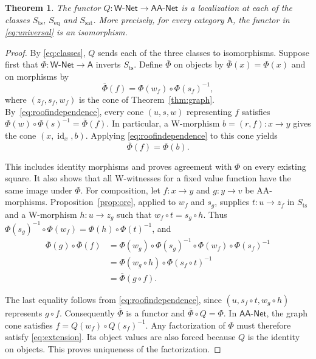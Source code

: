 \documentclass[11pt,a4paper]{article}
\newtheorem{theorem}{Theorem}[section]
\theoremstyle{definition}
\theoremstyle{remark}
\newcommand{\Wpar}{\mathsf{W\text{-}Net}}
\newcommand{\NetAA}{\mathsf{AA\text{-}Net}}
\newcommand{\id}{\operatorname{id}}
\newcommand{\Sts}{S_{\mathrm{ts}}}
\newcommand{\Seq}{S_{\mathrm{eq}}}
\newcommand{\Ssat}{S_{\mathrm{sat}}}
\begin{document}
\begin{theorem}\label{thm:wlocal}
The functor \(Q:\Wpar\to\NetAA\) is a localization at each of the
classes \(\Sts\), \(\Seq\) and \(\Ssat\). More precisely, for every
category \(\mathsf A\), the functor in \eqref{eq:universal} is an
isomorphism.
\end{theorem}
\begin{proof}
By \eqref{eq:classes}, \(Q\) sends each of the three classes to
isomorphisms. Suppose first that \(\Phi:\Wpar\to\mathsf A\) inverts
\(\Sts\). Define \(\overline\Phi\) on objects by
\(\overline\Phi(x)=\Phi(x)\) and on morphisms by
\begin{equation}\label{eq:extension}
 \overline\Phi(f)=\Phi(w_f)\circ\Phi(s_f)^{-1},
\end{equation}
where \((z_f,s_f,w_f)\) is the cone of Theorem~\ref{thm:graph}.
By~\eqref{eq:roofindependence}, every cone \((u,s,w)\) representing
\(f\) satisfies \(\Phi(w)\circ\Phi(s)^{-1}=\overline\Phi(f)\).
In particular, a W-morphism \(b=(r,f):x\to y\) gives the cone
\((x,\id_x,b)\). Applying \eqref{eq:roofindependence} to this
cone yields
\[
 \overline\Phi(f)=\Phi(b).
\]

This includes identity morphisms and proves agreement with \(\Phi\)
on every existing square. It also shows that all W-witnesses for a
fixed value function have the same image under \(\Phi\).
For composition, let \(f:x\to y\) and \(g:y\to v\) be
AA-morphisms. Proposition~\ref{prop:ore}, applied to \(w_f\) and
\(s_g\), supplies \(t:u\to z_f\) in \(\Sts\) and a
W-morphism \(h:u\to z_g\) such that
\(w_f\circ t=s_g\circ h\). Thus
\(\Phi(s_g)^{-1}\circ\Phi(w_f)
=\Phi(h)\circ\Phi(t)^{-1}\), and
\begin{align*}
 \overline\Phi(g)\circ\overline\Phi(f)
 &=\Phi(w_g)\circ\Phi(s_g)^{-1}
       \circ\Phi(w_f)\circ\Phi(s_f)^{-1}\\
 &=\Phi(w_g\circ h)\circ\Phi(s_f\circ t)^{-1}\\
 &=\overline\Phi(g\circ f).
\end{align*}

The last equality follows from \eqref{eq:roofindependence}, since
\((u,s_f\circ t,w_g\circ h)\) represents \(g\circ f\).
Consequently \(\overline\Phi\) is a functor and
\(\overline\Phi\circ Q=\Phi\).
In \(\NetAA\), the graph cone satisfies
\(f=Q(w_f)\circ Q(s_f)^{-1}\). Any factorization of \(\Phi\)
must therefore satisfy \eqref{eq:extension}. Its object values are
also forced because \(Q\) is the identity on objects. This proves
uniqueness of the factorization.


\end{proof}
\end{document}
